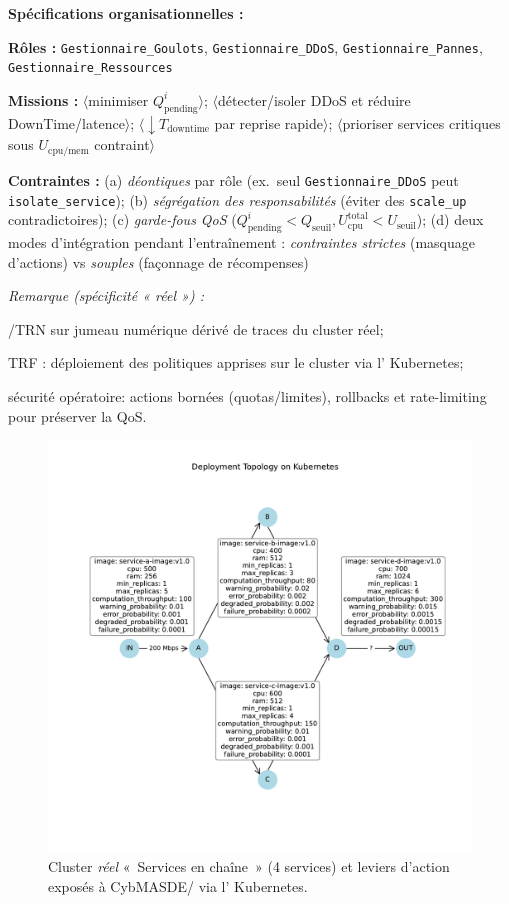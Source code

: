 \noindent\textbf{Spécifications organisationnelles :}
\begin{enumerate*}[label={\roman*)}, itemjoin={;\quad}]
  \item \textbf{Rôles :} \texttt{Gestionnaire\_Goulots}, \texttt{Gestionnaire\_DDoS}, \texttt{Gestionnaire\_Pannes}, \texttt{Gestionnaire\_Ressources}
  \item \textbf{Missions :}
  \(\langle\)minimiser \(Q_{\text{pending}}^i\)\(\rangle\);
  \(\langle\)détecter/isoler DDoS et réduire DownTime/latence\(\rangle\);
  \(\langle\)\(\downarrow T_{\text{downtime}}\) par reprise rapide\(\rangle\);
  \(\langle\)prioriser services critiques sous \(U_{\text{cpu/mem}}\) contraint\(\rangle\)
  \item \textbf{Contraintes :}
  (a) \emph{déontiques} par rôle (ex.~seul \texttt{Gestionnaire\_DDoS} peut \texttt{isolate\_service});
  (b) \emph{ségrégation des responsabilités} (éviter des \texttt{scale\_up} contradictoires);
  (c) \emph{garde-fous QoS} (\(Q_{\text{pending}}^i<Q_{\text{seuil}}, U_{\text{cpu}}^{\text{total}}<U_{\text{seuil}}\));
  (d) deux modes d’intégration pendant l’entraînement : \textit{contraintes strictes} (masquage d’actions) vs \textit{souples} (façonnage de récompenses)
\end{enumerate*}

\medskip
\noindent\textit{Remarque (spécificité « réel ») :}
\begin{enumerate*}[label={--}, itemjoin={\quad}]
  \item \textsc{/TRN} sur jumeau numérique dérivé de traces du cluster réel;
  \item \textsc{TRF} : déploiement des politiques apprises sur le cluster via l’ Kubernetes;
  \item sécurité opératoire: actions bornées (quotas/limites), rollbacks et rate-limiting pour préserver la QoS.
\end{enumerate*}

\begin{figure}[h!]
  \centering
  \includegraphics[trim=1.8cm 3.3cm 1.25cm 3.5cm, clip, width=0.6\linewidth]{figures/k8s_cluster_graph.pdf}
  \caption{Cluster \emph{réel} «~Services en chaîne~» (4 services) et leviers d’action exposés à CybMASDE/ via l’ Kubernetes.}
  \label{fig:k8s_microservices_real}
\end{figure}


